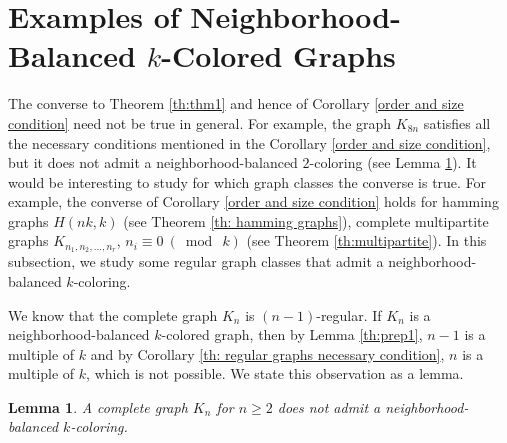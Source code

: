 \documentclass[12pt]{article}
\newtheorem{lemma}[theorem]{Lemma}
\newcommand{\nbc}{neighborhood-balanced $k$-coloring\xspace}
\newcommand{\nbcd}{neighborhood-balanced $k$-colored\xspace}
\begin{document}
\section{Examples of Neighborhood-Balanced $k$-Colored Graphs} \label{sec:examples}
The converse to Theorem \ref{th:thm1} and hence of Corollary \ref{order and size condition} need not be true in general. For example, the graph $K_{8n}$ satisfies all the necessary conditions mentioned in the Corollary \ref{order and size condition}, but it does not admit a neighborhood-balanced $2$-coloring (see Lemma \ref{completegraph}). 
It would be interesting to study for which graph classes the converse is true.
For example, the converse of Corollary \ref{order and size condition} holds for hamming graphs $H(nk,k)$ (see Theorem \ref{th: hamming graphs}), complete multipartite graphs $K_{n_1,n_2,\dots,n_r}$, $n_i\equiv 0\ (\bmod\ k)$ (see Theorem \ref{th:multipartite}).
In this subsection, we study some regular graph classes that admit a \nbc.
\par
We know that the complete graph $K_n$ is $(n-1)$-regular.
If $K_n$ is a \nbcd graph, then by Lemma \ref{th:prep1}, $n-1$ is a multiple of $k$ and by Corollary \ref{th: regular graphs necessary condition}, $n$ is a multiple of $k$, which is not possible.
We state this observation as a lemma.

\begin{lemma}\label{completegraph}
    A complete graph $K_n$ for $n \geq 2$ does not admit a \nbc.
\end{lemma}
\end{document}

